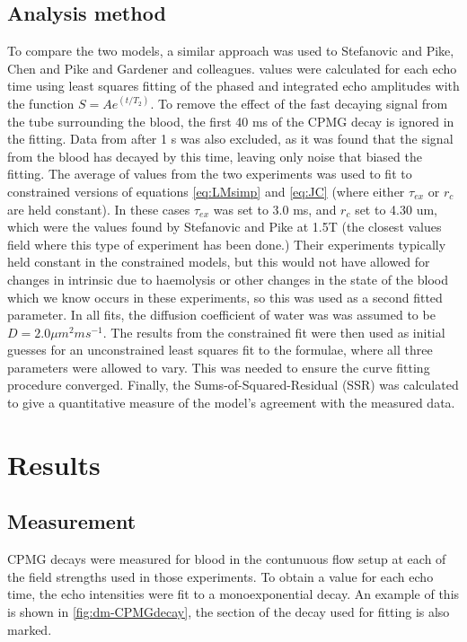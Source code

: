 \subsection*{Analysis method}
To compare the two models, a similar approach was used to Stefanovic and Pike\cite{StefanovicHumanwholebloodrelaxometry2004}, Chen and Pike \cite{ChenHumanwholeblood2009} and Gardener and colleagues\cite{GardenerDependencebloodR22010}.
\Ttwo values were calculated for each echo time using least squares fitting of the phased and integrated echo amplitudes with the function $S=Ae^{(t/T_2)}$.
To remove the effect of the fast decaying signal from the tube surrounding the blood, the first 40 ms of the CPMG decay is ignored in the fitting.
Data from after 1 s was also excluded, as it was found that the signal from the blood has decayed by this time, leaving only noise that biased the fitting.
The average of \Ttwo values from the two experiments was used to fit to constrained versions of equations \ref{eq:LMsimp} and \ref{eq:JC}  (where either $\tau_{ex}$ or $r_c$ are held constant).
In these cases $\tau_{ex}$ was set to 3.0 ms, and $r_c$ set to 4.30 um, which were the values found by Stefanovic and Pike at 1.5T\cite{StefanovicHumanwholebloodrelaxometry2004} (the closest values field where this type of experiment has been done.)
Their experiments typically held \TtwoO constant in the constrained models, but this would not have allowed for changes in intrinsic \Ttwo due to haemolysis or other changes in the state of the blood which we know occurs in these experiments, so this was used as a second fitted parameter.
In all fits, the diffusion coefficient of water was was assumed to be $D = 2.0 \mu m^2 ms^{-1}$.
The results from the constrained fit were then used as initial guesses for an unconstrained least squares fit to the formulae, where all three parameters were allowed to vary.
This was needed to ensure the curve fitting procedure converged.
Finally, the Sums-of-Squared-Residual (SSR) was calculated to give a quantitative measure of the model's agreement with the measured data.

\section{Results}

\subsection{\Ttwo Measurement}
CPMG decays were measured for blood in the contunuous flow setup at each of the field strengths used in those experiments.
To obtain a \Ttwo value for each echo time, the echo intensities were fit to a monoexponential decay.
An example of this is shown in \autoref{fig:dm-CPMGdecay}, the section of the decay used for fitting is also marked.

